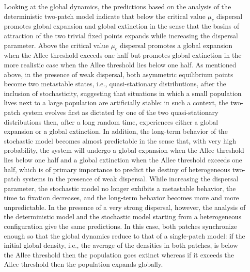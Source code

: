 \indent Looking at the global dynamics, the predictions based on the analysis of the deterministic two-patch model indicate that
 below the critical value $\mu_c$ dispersal promotes global expansion and global extinction in the sense that the basins of attraction
 of the two trivial fixed points expands while increasing the dispersal parameter.
 Above the critical value $\mu_c$ dispersal promotes a global expansion when the Allee threshold exceeds one half but promotes
 global extinction in the more realistic case when the Allee threshold lies below one half.
 As mentioned above, in the presence of weak dispersal, both asymmetric equilibrium points become two metastable states, i.e.,
 quasi-stationary distributions, after the inclusion of stochasticity, suggesting that situations in which a small population
 lives next to a large population are artificially stable: in such a context, the two-patch system evolves first as dictated
 by one of the two quasi-stationary distributions then, after a long random time, experiences either a global expansion or a
 global extinction.
 In addition, the long-term behavior of the stochastic model becomes almost predictable in the sense that, with very high
 probability, the system will undergo a global expansion when the Allee threshold lies below one half and a global extinction
 when the Allee threshold exceeds one half, which is of primary importance to predict the destiny of heterogeneous two-patch
 systems in the presence of weak dispersal.
 While increasing the dispersal parameter, the stochastic model no longer exhibits a metastable behavior, the time to fixation
 decreases, and the long-term behavior becomes more and more unpredictable.
 In the presence of a very strong dispersal, however, the analysis of the deterministic model and the stochastic model starting
 from a heterogeneous configuration give the same predictions.
 In this case, both patches synchronize enough so that the global dynamics reduce to that of a single-patch model:
 if the initial global density, i.e., the average of the densities in both patches, is below the Allee threshold then the
 population goes extinct whereas if it exceeds the Allee threshold then the population expands globally.

